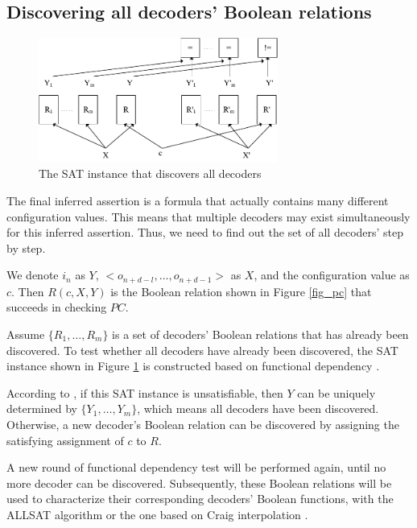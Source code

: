 \documentclass[runningheads,a4paper]{llncs}
\begin{document}
\subsection{Discovering all decoders' Boolean relations}

\begin{figure}[b]
\centering
\includegraphics[width=0.7\textwidth]{fdtest_dec}
\caption{The SAT instance that discovers all decoders}
\label{fig_fdtest_dec}
\end{figure}

The final inferred assertion is a formula that actually contains many different configuration values.
This means that multiple decoders may exist simultaneously for this inferred assertion.
Thus,
we need to find out the set of all decoders' step by step.

We denote $i_n$ as $Y$,
$<o_{n+d-l},\dots,o_{n+d-1}>$ as $X$,
and the configuration value as $c$.
Then $R(c,X,Y)$ is the Boolean relation shown in Figure \ref{fig_pc} that succeeds in checking $PC$.

Assume $\{R_1,\dots,R_{m}\}$ is a set of decoders' Boolean relations that has already been discovered.
To test whether all decoders have already been discovered,
the SAT instance shown in Figure \ref{fig_fdtest_dec} is constructed based on functional dependency \cite{funcdep}.



According to \cite{ShengYuShen:tcad12},
if this SAT instance is unsatisfiable,
then $Y$ can be uniquely determined by $\{Y_1,\dots,Y_m\}$,
which means all decoders have been discovered.
Otherwise,
a new decoder's Boolean relation can be discovered by assigning the satisfying assignment of $c$ to $R$.

A new round of functional dependency test will be performed again,
until no more decoder can be discovered.
Subsequently,
these Boolean relations will be used to characterize their corresponding decoders' Boolean functions,
with the ALLSAT algorithm \cite{ShengYuShen:tcad} or the one based on Craig interpolation \cite{Roland:iccad11}.
\end{document}
